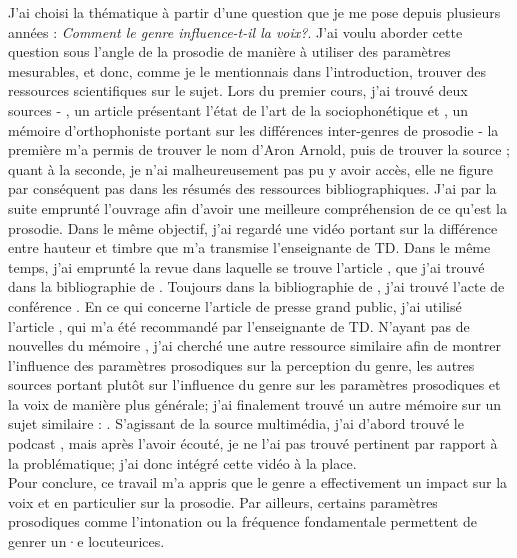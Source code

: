  J'ai choisi la thématique à partir d'une question que je me pose depuis plusieurs années : \textit{Comment le genre influence-t-il la voix?}. J'ai voulu aborder cette question sous l'angle de la prosodie de manière à utiliser des paramètres mesurables, et donc, comme je le mentionnais dans l'introduction, trouver des ressources scientifiques sur le sujet. %
 Lors du premier cours, j'ai trouvé deux sources - \parencite{Can15}, un article présentant l'état de l'art de la sociophonétique et \parencite{Lek16}, un mémoire d'orthophoniste portant sur les différences inter-genres de prosodie - la première m'a permis de trouver le nom d'Aron Arnold, puis de trouver la source \parencite{Pep20}; quant à la seconde, je n'ai malheureusement pas pu y avoir accès, elle ne figure par conséquent pas dans les résumés des ressources bibliographiques. 
 J'ai par la suite emprunté l'ouvrage \parencite{DiC13} afin d'avoir une meilleure compréhension de ce qu'est la prosodie. Dans le même objectif, j'ai regardé une vidéo portant sur la différence entre hauteur et timbre que m'a transmise l'enseignante de TD. 
 Dans le même temps, j'ai emprunté la revue dans laquelle se trouve l'article \parencite{Boe75}, que j'ai trouvé dans la bibliographie de \parencite{Pep20}.
 Toujours dans la bibliographie de \parencite{Pep20}, j'ai trouvé l'acte de conférence \parencite{Pep16}.
 En ce qui concerne l'article de presse grand public, j'ai utilisé l'article \parencite{Bro18}, qui m'a été recommandé par l'enseignante de TD.
 N'ayant pas de nouvelles du mémoire \parencite{Lek16}, j'ai cherché une autre ressource similaire afin de montrer l'influence des paramètres prosodiques sur la perception du genre, les autres sources portant plutôt sur l'influence du genre sur les paramètres prosodiques et la voix de manière plus générale; j'ai finalement trouvé un autre mémoire sur un sujet similaire : \parencite{Gar22}.
 S'agissant de la source multimédia, j'ai d'abord trouvé le podcast \parencite{podcast}, mais après l'avoir écouté, je ne l'ai pas trouvé pertinent par rapport à la problématique; j'ai donc intégré cette vidéo \parencite{video} à la place.\\

 Pour conclure, ce travail m'a appris que le genre a effectivement un impact sur la voix et en particulier sur la prosodie. Par ailleurs, certains paramètres prosodiques comme l'intonation ou la fréquence fondamentale permettent de genrer un·e locuteurices.\\


